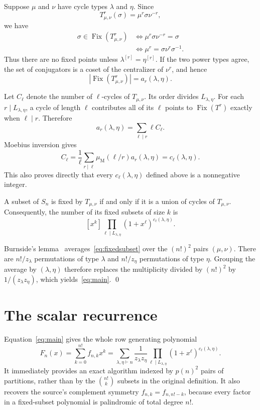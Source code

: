 \documentclass[11pt]{article}
\newcommand{\Fix}{\operatorname{Fix}}
\begin{document}
Suppose $\mu$ and $\nu$ have cycle types $\lambda$ and $\eta$. Since
\[
 T_{\mu,\nu}^{r}(\sigma)=\mu^r\sigma\nu^{-r},
\]
we have
\begin{align*}
 \sigma\in\Fix(T_{\mu,\nu}^{r})
 &\Longleftrightarrow \mu^r\sigma\nu^{-r}=\sigma\\
 &\Longleftrightarrow \mu^r=\sigma\nu^r\sigma^{-1}.
\end{align*}
Thus there are no fixed points unless
$\lambda^{[r]}=\eta^{[r]}$. If the two power types agree, the set of
conjugators is a coset of the centralizer of $\nu^r$, and hence
\begin{equation}\label{eq:fixpower}
 |\Fix(T_{\mu,\nu}^{r})|=a_r(\lambda,\eta).
\end{equation}

Let $C_\ell$ denote the number of $\ell$-cycles of $T_{\mu,\nu}$. Its
order divides $L_{\lambda,\eta}$. For each $r\mid L_{\lambda,\eta}$,
a cycle of length $\ell$ contributes all of its $\ell$ points to
$\Fix(T^r)$ exactly when $\ell\mid r$. Therefore
\[
 a_r(\lambda,\eta)=\sum_{\ell\mid r}\ell C_\ell.
\]
Moebius inversion gives
\[
 C_\ell=\frac1\ell\sum_{r\mid\ell}
 \mu_{\mathrm M}(\ell/r)a_r(\lambda,\eta)
 =c_\ell(\lambda,\eta).
\]
This also proves directly that every $c_\ell(\lambda,\eta)$ defined above
is a nonnegative integer.

A subset of $S_n$ is fixed by $T_{\mu,\nu}$ if and only if it is a union
of cycles of $T_{\mu,\nu}$. Consequently, the number of its fixed subsets
of size $k$ is
\begin{equation}\label{eq:fixedsubset}
 [x^k]\prod_{\ell\mid L_{\lambda,\eta}}
 (1+x^\ell)^{c_\ell(\lambda,\eta)}.
\end{equation}

Burnside's lemma~\cite{Cameron} averages~\eqref{eq:fixedsubset} over the
$(n!)^2$ pairs $(\mu,\nu)$. There are $n!/z_\lambda$ permutations of type
$\lambda$ and $n!/z_\eta$ permutations of type $\eta$. Grouping the
average by $(\lambda,\eta)$ therefore replaces the multiplicity divided by
$(n!)^2$ by $1/(z_\lambda z_\eta)$, which yields~\eqref{eq:main}. \qed

\section{The scalar recurrence}

Equation~\eqref{eq:main} gives the whole row generating polynomial
\[
 F_n(x)=\sum_{k=0}^{n!}f_{n,k}x^k
 =\sum_{\lambda,\eta\vdash n}\frac1{z_\lambda z_\eta}
 \prod_{\ell\mid L_{\lambda,\eta}}
 (1+x^\ell)^{c_\ell(\lambda,\eta)}.
\]
It immediately provides an exact algorithm indexed by $p(n)^2$ pairs of
partitions, rather than by the $\binom{n!}{k}$ subsets in the original
definition. It also recovers the source's complement symmetry
$f_{n,k}=f_{n,n!-k}$, because every factor in a fixed-subset polynomial is
palindromic of total degree $n!$.
\end{document}
